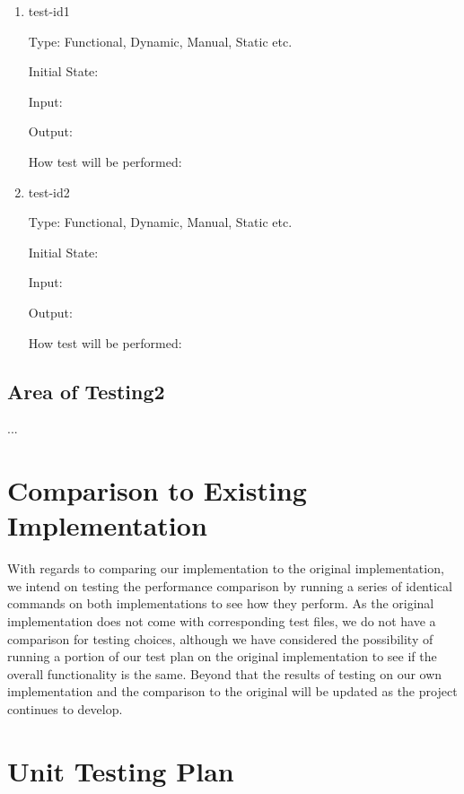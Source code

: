 \documentclass[12pt, titlepage]{article}
\begin{document}
\begin{enumerate}

\item{test-id1\\}

Type: Functional, Dynamic, Manual, Static etc.
					
Initial State: 
					
Input: 
					
Output: 
					
How test will be performed: 
					
\item{test-id2\\}

Type: Functional, Dynamic, Manual, Static etc.
					
Initial State: 
					
Input: 
					
Output: 
					
How test will be performed: 

\end{enumerate}

\subsection{Area of Testing2}

...

	
\section{Comparison to Existing Implementation}	

With regards to comparing our implementation to the original implementation, we intend on testing the performance comparison by running a series of identical commands on both implementations to see how they perform. As the original implementation does not come with corresponding test files, we do not have a comparison for testing choices, although we have considered the possibility of running a portion of our test plan on the original implementation to see if the overall functionality is the same. Beyond that the results of testing on our own implementation and the comparison to the original will be updated as the project continues to develop. 
				
\section{Unit Testing Plan}
		
\end{document}
